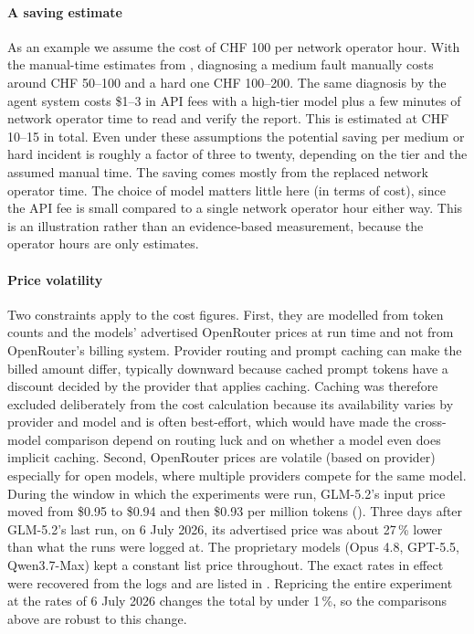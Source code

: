 \paragraph{A saving estimate} As an example we assume the cost of CHF 100 per network operator hour.
With the manual-time estimates from , diagnosing a medium fault
manually costs around CHF 50--100 and a hard one CHF 100--200. The same diagnosis by the agent
system costs \$1--3 in API fees with a high-tier model plus a few minutes of network operator time to
read and verify the report. This is estimated at CHF 10--15 in total. Even under these assumptions
the potential saving per medium or hard incident is roughly a factor of three to twenty, depending on
the tier and the assumed manual time. The
saving comes mostly from the replaced network operator time. The choice of model matters little here (in terms of cost),
since the API fee is small compared to a single network operator hour either way. This is an
illustration rather than an evidence-based measurement, because the operator hours are only estimates.

\paragraph{Price volatility} Two constraints apply to the cost figures. First, they are
modelled from token counts and the models' advertised OpenRouter prices at run time and not from
OpenRouter's billing system. Provider routing and prompt caching can make the billed amount differ, typically
downward because cached prompt tokens have a discount decided by the provider that applies caching.
Caching was therefore excluded deliberately from the cost calculation because its availability varies by provider and model and is often
best-effort, which would have made the cross-model comparison depend on routing luck and on whether a model even does implicit caching.
Second, OpenRouter prices are volatile (based on provider) especially for open models, where multiple providers compete for the
same model. During the window in which the experiments were run, GLM-5.2's input price
moved from \$0.95 to \$0.94 and then \$0.93 per million tokens (). Three days after GLM-5.2's last run, on 6 July
2026, its advertised price was about 27\,\% lower than what the runs were logged at. The proprietary models
(Opus 4.8, GPT-5.5, Qwen3.7-Max) kept a constant list price throughout. The exact rates in effect
were recovered from the logs and are listed in . Repricing the entire
experiment at the rates of 6 July 2026 changes the total by under 1\,\%, so the comparisons above
are robust to this change.

